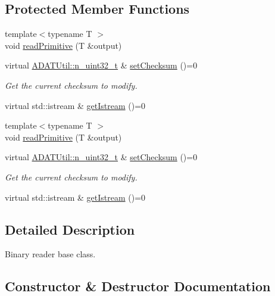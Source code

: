 \subsection*{Protected Member Functions}
\begin{DoxyCompactItemize}
\item 
{\footnotesize template$<$typename T $>$ }\\void \mbox{\hyperlink{classADATIO_1_1BinaryReader_aeb7e739afca615aff19646e64b8da320}{read\+Primitive}} (T \&output)
\item 
virtual \mbox{\hyperlink{namespaceADATUtil_ad945a8afa4db2d1f89b731964adae97e}{A\+D\+A\+T\+Util\+::n\+\_\+uint32\+\_\+t}} \& \mbox{\hyperlink{classADATIO_1_1BinaryReader_a33d291f073bf2e1f71f6bdbe40ce343a}{set\+Checksum}} ()=0
\begin{DoxyCompactList}\small\item\em Get the current checksum to modify. \end{DoxyCompactList}\item 
virtual std\+::istream \& \mbox{\hyperlink{classADATIO_1_1BinaryReader_aa34e73d5f1e6b2b3b48c27e97f6a85a0}{get\+Istream}} ()=0
\item 
{\footnotesize template$<$typename T $>$ }\\void \mbox{\hyperlink{classADATIO_1_1BinaryReader_aeb7e739afca615aff19646e64b8da320}{read\+Primitive}} (T \&output)
\item 
virtual \mbox{\hyperlink{namespaceADATUtil_ad945a8afa4db2d1f89b731964adae97e}{A\+D\+A\+T\+Util\+::n\+\_\+uint32\+\_\+t}} \& \mbox{\hyperlink{classADATIO_1_1BinaryReader_a33d291f073bf2e1f71f6bdbe40ce343a}{set\+Checksum}} ()=0
\begin{DoxyCompactList}\small\item\em Get the current checksum to modify. \end{DoxyCompactList}\item 
virtual std\+::istream \& \mbox{\hyperlink{classADATIO_1_1BinaryReader_aa34e73d5f1e6b2b3b48c27e97f6a85a0}{get\+Istream}} ()=0
\end{DoxyCompactItemize}


\subsection{Detailed Description}
Binary reader base class. 

\subsection{Constructor \& Destructor Documentation}
\mbox{\label{classADATIO_1_1BinaryReader_a19220cacd1c2fce407b2606d202ff1c5}} 
